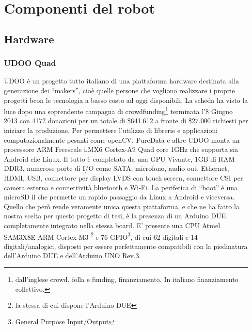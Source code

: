 \chapter{Componenti del robot}
\section{Hardware}
\subsection{UDOO Quad}
UDOO è un progetto tutto italiano di una piattaforma hardware destinata alla generazione dei ``makers'', cioè quelle persone che vogliono realizzare i proprie progetti bcon le tecnologia a basso costo ad oggi disponibili. La scheda ha visto la luce dopo una soprendente campagna di crowdfunding\footnote{dall'inglese crowd, folla e funding, finanziamento. In italiano finanziamento collettivo.} terminata l'8 Giugno 2013 con 4172 donazioni per un totale di \$641.612 a fronte di \$27.000 richiesti per iniziare la produzione. Per permettere l'utilizzo di librerie e applicazioni computazionalmente pesanti come openCV, PureData e altre UDOO monta un processore ARM Freescale i.MX6 Cortex-A9 Quad core 1GHz che supporta sia Android che Linux. Il tutto è completato da una GPU Vivante, 1GB di RAM DDR3, numerose porte di I/O come SATA, microfono, audio out, Ethernet, HDMI, USB, connettore per display LVDS con touch screen, connettore CSI per camera esterna e connettività bluetooth e Wi-Fi. La periferica di ``boot'' è una microSD il che permette un rapido passaggio da Linux a Android e viceversa. Quello che però rende veramente unica questa piattaforma, e che ne ha fatto la nostra scelta per questo progetto di tesi, è la presenza di un Arduino DUE completamente integrato nella stessa board. 
E' presente una CPU Atmel SAM3X8E ARM Cortex-M3 \footnote{la stessa di cui dispone l'Arduino DUE} e 76 GPIO\footnote{General Purpose Input/Output}, di cui 62 digitali e 14 digitali/analogici, disposti per essere perfettamente compatibili con la piedinatura dell'Arduino DUE e dell'Arduino UNO Rev.3.

